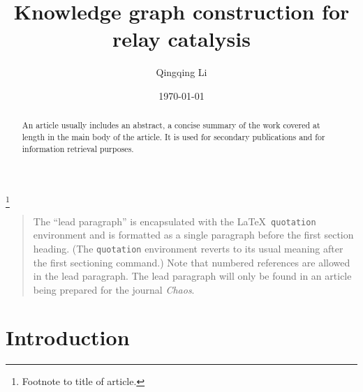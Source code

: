 \documentclass[%
 aip,
 jmp,%
 amsmath,amssymb,
 reprint,%
]{revtex4-2}
\begin{document}

\title[Knowledge graph construction for relay catalysis]{Knowledge graph construction for relay catalysis}%
\thanks{Footnote to title of article.}

\author{Qingqing Li}

\date{\today}%

\begin{abstract}
An article usually includes an abstract, a concise summary of the work
covered at length in the main body of the article. It is used for
secondary publications and for information retrieval purposes. 
%
\end{abstract}

\maketitle

\begin{quotation}
The ``lead paragraph'' is encapsulated with the \LaTeX\ 
\verb+quotation+ environment and is formatted as a single paragraph before the first section heading. 
(The \verb+quotation+ environment reverts to its usual meaning after the first sectioning command.) 
Note that numbered references are allowed in the lead paragraph.
%
The lead paragraph will only be found in an article being prepared for the journal \textit{Chaos}.
\end{quotation}

\section{\label{sec:level1}Introduction}


\end{document}
